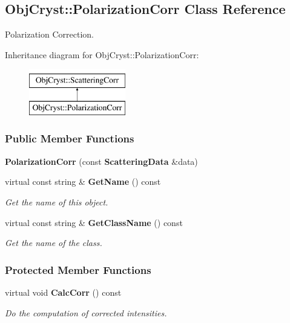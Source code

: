 \subsection{\-Obj\-Cryst\-:\-:\-Polarization\-Corr \-Class \-Reference}
\label{a00061}


\-Polarization \-Correction.  


\-Inheritance diagram for \-Obj\-Cryst\-:\-:\-Polarization\-Corr\-:\begin{figure}[H]
\begin{center}
\leavevmode
\includegraphics[height=2.000000cm]{a00061}
\end{center}
\end{figure}
\subsubsection*{\-Public \-Member \-Functions}
\begin{DoxyCompactItemize}
\item 
{\bfseries \-Polarization\-Corr} (const {\bf \-Scattering\-Data} \&data)\label{a00061_a2a4847d1595188d8023f20c9c9d0d4ce}

\item 
virtual const string \& {\bf \-Get\-Name} () const \label{a00061_a6bfca1f83186379f77e2ee2ef5e65ac5}

\begin{DoxyCompactList}\small\item\em \-Get the name of this object. \end{DoxyCompactList}\item 
virtual const string \& {\bf \-Get\-Class\-Name} () const \label{a00061_ae298bdf956280d610cc18aad4acb1af7}

\begin{DoxyCompactList}\small\item\em \-Get the name of the class. \end{DoxyCompactList}\end{DoxyCompactItemize}
\subsubsection*{\-Protected \-Member \-Functions}
\begin{DoxyCompactItemize}
\item 
virtual void {\bf \-Calc\-Corr} () const \label{a00061_a3030bd67935be0434c1cebfd385b82a2}

\begin{DoxyCompactList}\small\item\em \-Do the computation of corrected intensities. \end{DoxyCompactList}\end{DoxyCompactItemize}
